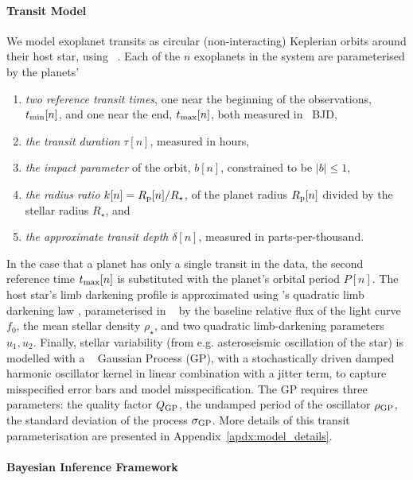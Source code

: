 \documentclass[floatfix,ApJL,twocolumn]{aastex631}
\begin{document}
\paragraph{Transit Model}
We model exoplanet transits as circular (non-interacting) Keplerian orbits around their host star, using \exoplanet~\citep{Foreman-Mackey:2021:JOSS}. Each of the $n$ exoplanets in the system are parameterised by the planets'
\begin{enumerate}
  \item \emph{two reference transit times}, one near the beginning of the observations, $t_{\rm min}[n]$, and one near the end, $t_{\rm max}[n]$, both measured in \tess\ BJD,
  \item \emph{the transit duration} $\tau[n]$, measured in hours, 
  \item \emph{the impact parameter} of the orbit, $b[n]$, constrained to be $|b| \le 1$, 
  \item \emph{the radius ratio} $k[n]=R_{\rm p}[n] / R_\star$, of the planet radius $R_{\rm p}[n]$ divided by the stellar radius $R_\star$, and
  \item \emph{the approximate transit depth} $\delta[n]$, measured in parts-per-thousand.
\end{enumerate}
In the case that a planet has only a single transit in the data, the second reference time $t_{\rm max}[n]$ is substituted with the planet's orbital period $P[n]$.
The host star's limb darkening profile is approximated using \citet{Kipping:2013:MNRAS}'s quadratic limb darkening law \citep{Claret:2000:A&A, Mandel:2002:ApJL}, parameterised in \starry~\citep{Luger:2019:AJ} by the baseline relative flux of the light curve $f_0$,
the mean stellar density $\rho_\star$,
and two quadratic limb-darkening parameters $u_1, u_2$.
Finally, stellar variability (from e.g. asteroseismic oscillation of the star)  is modelled with a \celerite~\citep{Foreman-Mackey:2017:ascl} Gaussian Process (GP), with a stochastically driven damped harmonic oscillator kernel in linear combination with a jitter term, to capture misspecified error bars and model misspecification. 
The GP requires three parameters: the quality factor $Q_{\rm GP}$, the undamped period of the oscillator $\rho_{\rm GP}$, the standard deviation of the process $\sigma_{\rm GP}$.
More details of this transit parameterisation are presented in Appendix~\ref{apdx:model_details}. 




\paragraph{Bayesian Inference Framework}
\end{document}
